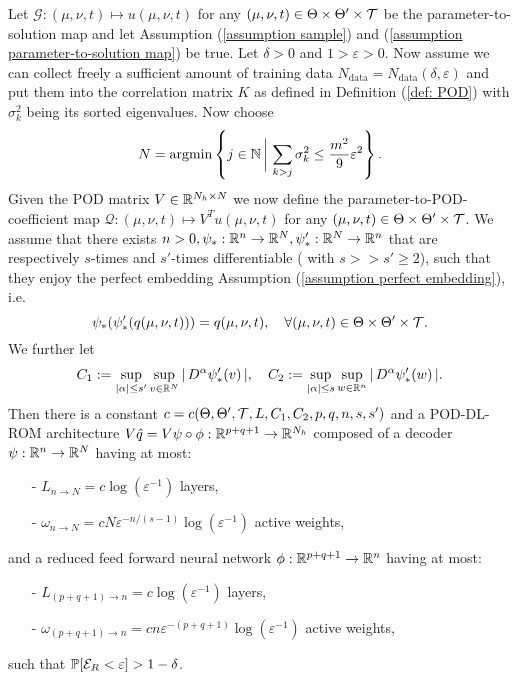 \begin{theorem} \label{theo: PAC bound for POD-DL-ROM}
    Let $\mathcal{G}: (\mu, \nu, t) \mapsto u(\mu, \nu, t)$ for any $(\mu, \nu, t) \in \Theta \times \Theta' \times \mathcal{T}$ be the
    parameter-to-solution map and let Assumption (\ref{assumption sample}) and (\ref{assumption parameter-to-solution map}) be true. Let $\delta > 0$ and $1 > \varepsilon > 0$.
    Now assume we can collect freely a sufficient amount of training data $N_{\text{data}} = N_{\text{data}}(\delta, \varepsilon)$ and put them into the
    correlation matrix $K$ as defined in Definition (\ref{def: POD}) with $\sigma_k^2$ being its sorted eigenvalues. Now choose
    \begin{equation*}
        N = \operatorname{argmin} \left\{ j \in \mathbb{N} \, \bigg\vert \, \sum_{k > j} \sigma^2_k \leq \frac{m^2}{9} \varepsilon^2 \right\}.
    \end{equation*}
    Given the POD matrix $V \in \mathbb{R}^{N_h \times N}$ we now define the parameter-to-POD-coefficient map $\mathcal{Q}: (\mu, \nu, t) \mapsto V^T u(\mu, \nu, t)$ for 
    any $(\mu, \nu, t) \in \Theta \times \Theta' \times \mathcal{T}$. We assume that there exists $n > 0, \psi_* : \mathbb{R}^n \to \mathbb{R}^N, \psi_*' : \mathbb{R}^N \to \mathbb{R}^n$ that are respectively $s$-times and
    $s'$-times differentiable ( with $s >> s' \geq 2$), such that they enjoy the perfect embedding Assumption (\ref{assumption perfect embedding}), i.e. 
    \begin{equation*}
        \psi_*(\psi_*'(q(\mu, \nu, t))) = q(\mu, \nu, t), \quad \forall (\mu, \nu, t) \in \Theta \times \Theta' \times \mathcal{T}.
    \end{equation*}
    We further let 
    \begin{equation*}
        C_1 := \sup\limits_{\vert \alpha \vert \leq s'} \sup\limits_{v \in \mathbb{R}^N} \vert \, D^\alpha \psi_*'(v) \, \vert, \quad 
        C_2 := \sup\limits_{\vert \alpha \vert \leq s} \sup\limits_{w \in \mathbb{R}^n} \vert \, D^\alpha \psi_*'(w) \, \vert.
    \end{equation*}
    Then there is a constant $c = c(\Theta, \Theta', \mathcal{T}, L, C_1, C_2, p, q, n, s, s')$ and a POD-DL-ROM architecture $V \hat{q} =
    V \psi \circ \phi: \mathbb{R}^{p+q+1} \to \mathbb{R}^{N_h}$ composed of a decoder $\psi: \mathbb{R}^n \to \mathbb{R}^N$ having at most:
    \begin{enumerate}
        \item[-] $L_{n \to N} = c \log(\varepsilon^{-1})$ layers,
        \item[-] $\omega_{n \to N} = cN \varepsilon^{-n/(s-1)} \log(\varepsilon^{-1})$ active weights,
    \end{enumerate}
    and a reduced feed forward neural network $\phi: \mathbb{R}^{p+q+1} \to \mathbb{R}^n$ having at most:
    \begin{enumerate}
        \item[-] $L_{(p+q+1) \to n} = c \log(\varepsilon^{-1})$ layers,
        \item[-] $\omega_{(p+q+1) \to n} = cn \varepsilon^{-(p+q+1)} \log(\varepsilon^{-1})$ active weights,
    \end{enumerate}
    such that $\mathbb{P}[\mathcal{E}_R < \varepsilon] > 1 - \delta$.
\end{theorem}
